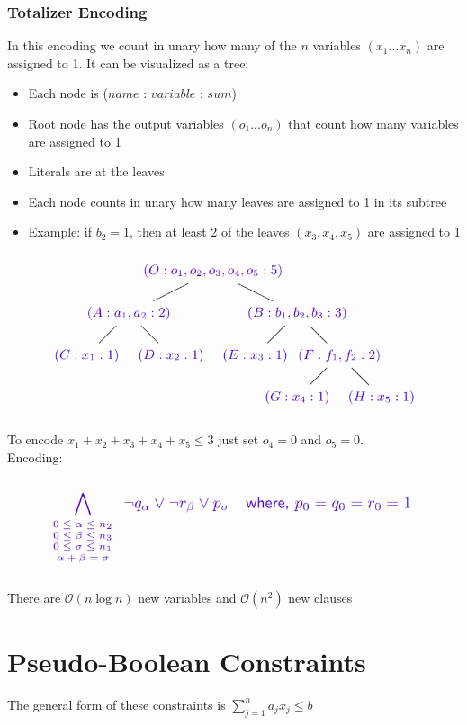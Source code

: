 \documentclass[10pt,a4paper]{report}
\begin{document}
\subsubsection{Totalizer Encoding}
In this encoding we count in unary how many of the $n$ variables $(x_1 ... x_n)$ are assigned to 1. It can be visualized as a tree:
\begin{itemize}
    \item Each node is ($name$ : $variable$ : $sum$)
    \item Root node has the output variables $(o_1 ... o_n)$ that count how many variables are assigned to 1
    \item Literals are at the leaves
    \item Each node counts in unary how many leaves are assigned to 1 in its subtree
    \item Example: if $b_2 = 1$, then at least 2 of the leaves $(x_3, x_4, x_5)$ are
    assigned to 1
\end{itemize}
\begin{figure}[H]
    \centering
    \includegraphics[scale=0.5]{2.png}
\end{figure}
To encode $x_1 + x_2 + x_3 + x_4 + x_5 \leq 3$ just set $o_4=0$ and $o_5=0$.\\
Encoding:
\begin{figure}[H]
    \centering
    \includegraphics[scale=0.5]{3.png}
\end{figure}
There are $\mathcal{O}(n\log n)$ new variables and $\mathcal{O}(n^2)$ new clauses

\section{Pseudo-Boolean Constraints}
The general form of these constraints is $\sum_{j=1}^n a_jx_j \leq b$
\end{document}
